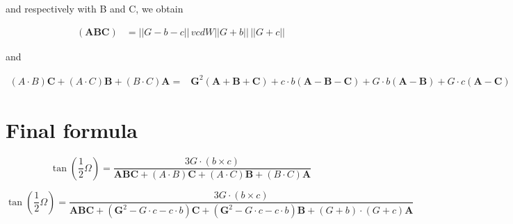 \documentclass[10pt,a4paper]{article}
\begin{document}
and respectively with B and C, we obtain


\begin{align}
(\mathbf{A}\mathbf{B}\mathbf{C}) &= ||G-b-c||\,vcdW||G+b||\,||G+c||
\end{align}

and


\begin{align}
 \left({A}\cdot {B}\right)\mathbf{C}
  + \left({A}\cdot {C}\right)\mathbf{B}
   + \left({B}\cdot {C}\right)\mathbf{A}
	=& \mathbf{G}^2 (\mathbf{A} + \mathbf{B} + \mathbf{C})
	+ c \cdot b (\mathbf{A} - \mathbf{B} - \mathbf{C})
	 + G \cdot b (\mathbf{A} - \mathbf{B})
	  + G \cdot c (\mathbf{A} - \mathbf{C})
\end{align}


\section{Final formula}


$$
{\displaystyle \tan \left({\frac {1}{2}}\Omega \right)
  = {\frac {3 G \cdot \left( b \times c \right)}
    {\mathbf{A}\mathbf{B}\mathbf{C} + \left({A}\cdot {B}\right)\mathbf{C}
      + \left({A}\cdot {C}\right)\mathbf{B}
      + \left({B}\cdot {C}\right)\mathbf{A}}}}
$$


$$
{\displaystyle \tan \left({\frac {1}{2}}\Omega \right)
  = {\frac {3 G \cdot \left( b \times c \right)}
    {\mathbf{A}\mathbf{B}\mathbf{C} +
    (\mathbf{G}^2 - G \cdot c - c \cdot b)\mathbf{C}
      + (\mathbf{G}^2 - G \cdot c - c \cdot b)\mathbf{B}
      + \left( G + b \right) \cdot \left( G + c \right) \mathbf{A}
      }}}
$$
\end{document}
